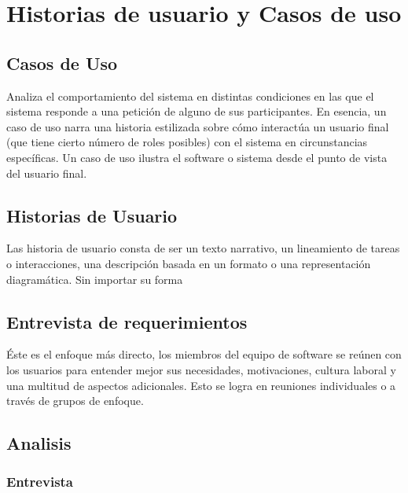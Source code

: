 \documentclass[spanish, 12pt]{article}
\begin{document}
	\section{Historias de usuario y Casos de uso}
	\label{historias-de-usuario-y-casos-de-uso}

	\subsection{Casos de Uso}
	\label{casos-de-uso}

	Analiza el comportamiento del sistema en distintas condiciones en las que el sistema
	responde a una petición de alguno de sus participantes. En esencia, un caso de
	uso narra una historia estilizada sobre cómo interactúa un usuario final (que
	tiene cierto número de roles posibles) con el sistema en circunstancias específicas.
	Un caso de uso ilustra el software o sistema desde el punto de vista del
	usuario final.

	\subsection{Historias de Usuario}
	\label{historias-de-usuario}

	Las historia de usuario consta de ser un texto narrativo, un lineamiento de
	tareas o interacciones, una descripción basada en un formato o una representación
	diagramática. Sin importar su forma

	\subsection{Entrevista de requerimientos}
	\label{entrevista-de-requerimientos}

	Éste es el enfoque más directo, los miembros del equipo de software se reúnen con
	los usuarios para entender mejor sus necesidades, motivaciones, cultura laboral
	y una multitud de aspectos adicionales. Esto se logra en reuniones
	individuales o a través de grupos de enfoque.

	\subsection{Analisis}
	\label{analisis}

	\subsubsection{Entrevista}
	\label{entrevista}
\end{document}
